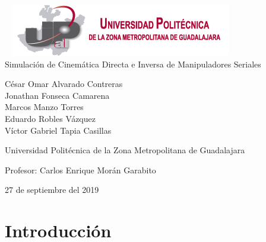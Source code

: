 \documentclass[11pt,a4paper,oldfontcommands,oneside]{memoir}
\begin{document}
%
%
\thispagestyle{empty}

{%
\sffamily
\centering
\Large

~\vspace{\fill}
\includegraphics[scale=.85]{logo1.png} \\
{\huge 
\vspace{4cm}
Simulación de Cinemática Directa e Inversa de Manipuladores Seriales
}
\vspace{2.5cm}

{\LARGE
César Omar Alvarado Contreras\\
Jonathan Fonseca Camarena\\
Marcos Manzo Torres\\
Eduardo Robles Vázquez\\
Víctor Gabriel Tapia Casillas
}

\vspace{3.5cm}

Universidad Politécnica de la Zona Metropolitana de Guadalajara

\vspace{2.5cm}

Profesor: Carlos Enrique Morán Garabito

\vspace{\fill}

27 de septiembre del 2019

}%

\vspace{.5cm}
\hfill\break




\tableofcontents*

\clearpage


\chapter{Introducción}
\end{document}
